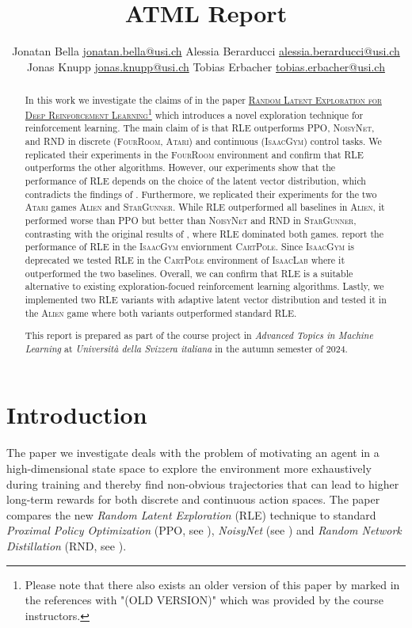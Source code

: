 \documentclass[10pt]{article} %
\title{ATML Report}
\author{%
  \name Jonatan Bella \email \href{mailto:jonatan.bella@usi.ch}{jonatan.bella@usi.ch}
  \AND
  \name Alessia Berarducci \email \href{mailto:alessia.berarducci@usi.ch}{alessia.berarducci@usi.ch}
  \AND
  \name Jonas Knupp \email \href{mailto:jonas.knupp@usi.ch}{jonas.knupp@usi.ch}
  \AND
  \name Tobias Erbacher \email \href{mailto:tobias.erbacher@usi.ch}{tobias.erbacher@usi.ch}
}
\begin{document}
\maketitle

\begin{abstract}
In this work we investigate the claims of \cite{rle-paper} in the paper \href{https://arxiv.org/abs/2407.13755}{\textsc{Random Latent Exploration for Deep Reinforcement Learning}}\footnote{Please note that there also exists an older version of this paper by \cite{rle-paper-old} marked in the references with "(OLD VERSION)" which was provided by the course instructors.} which introduces a novel exploration technique for reinforcement learning. The main claim of \cite{rle-paper} is that RLE outperforms \textsc{PPO}, \textsc{NoisyNet}, and \textsc{RND} in discrete (\textsc{FourRoom}, \textsc{Atari}) and continuous (\textsc{IsaacGym}) control tasks. We replicated their experiments in the \textsc{FourRoom} environment and confirm that \textsc{RLE} outperforms the other algorithms. However, our experiments show that the performance of \textsc{RLE} depends on the choice of the latent vector distribution, which contradicts the findings of \cite{rle-paper}. Furthermore, we replicated their experiments for the two \textsc{Atari} games \textsc{Alien} and \textsc{StarGunner}. While RLE outperformed all baselines in \textsc{Alien}, it performed worse than \textsc{PPO} but better than \textsc{NoisyNet} and \textsc{RND} in \textsc{StarGunner}, contrasting with the original results of \cite{rle-paper}, where RLE dominated both games. \cite{rle-paper} report the performance of \textsc{RLE} in the \textsc{IsaacGym} enviornment \textsc{CartPole}. Since \textsc{IsaacGym} is deprecated we tested RLE in the \textsc{CartPole} environment of \textsc{IsaacLab} where it outperformed the two baselines. Overall, we can confirm that \textsc{RLE} is a suitable alternative to existing exploration-focued reinforcement learning algorithms. Lastly, we implemented two \textsc{RLE} variants with adaptive latent vector distribution and tested it in the \textsc{Alien} game where both variants outperformed standard \textsc{RLE}.


This report is prepared as part of the course project in \textit{Advanced Topics in Machine Learning} at \textit{Università della Svizzera italiana} in the autumn semester of 2024. 
\end{abstract}


\section{Introduction}
\noindent The paper we investigate deals with the problem of motivating an agent in a high-dimensional state space to explore the environment more exhaustively during training and thereby find non-obvious trajectories that can lead to higher long-term rewards for both discrete and continuous action spaces. The paper compares the new \textit{Random Latent Exploration} (RLE) technique to standard \textit{Proximal Policy Optimization} (PPO, see \cite{ppo-paper}), \textit{NoisyNet} (see \cite{noisynet-paper}) and \textit{Random Network Distillation} (RND, see \cite{rnd-paper}).
\end{document}
